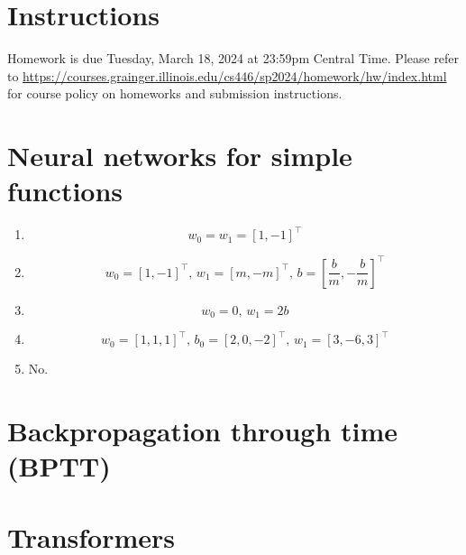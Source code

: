 \documentclass[12pt]{article}
\begin{document}
\singlespacing

\renewcommand{\familydefault}{\rmdefault}


\section{Instructions}

Homework is due Tuesday, March 18, 2024 at 23:59pm Central Time.
Please refer to \url{https://courses.grainger.illinois.edu/cs446/sp2024/homework/hw/index.html} for course policy on homeworks and submission instructions.

\section{Neural networks for simple functions}
\begin{enumerate}
    \item   \[w_0 = w_1 = [1, -1]^{\top}\]
    \item   \[w_0 = [1, -1]^{\top}, \, w_1 = [m, -m]^{\top}, \, b = [\frac{b}{m}, -\frac{b}{m}]^{\top}\]
    \item   \[w_0 = 0, \, w_1 = 2b\]
    \item   \[w_0 = [1, 1, 1]^{\top}, \, b_0 = [2, 0,-2]^{\top}, \, w_1 = [3, -6, 3]^{\top}\]
    \item   No. 
\end{enumerate}
\newpage

\section{Backpropagation through time (BPTT)}

\newpage

\section{Transformers}

\newpage
\end{document}
